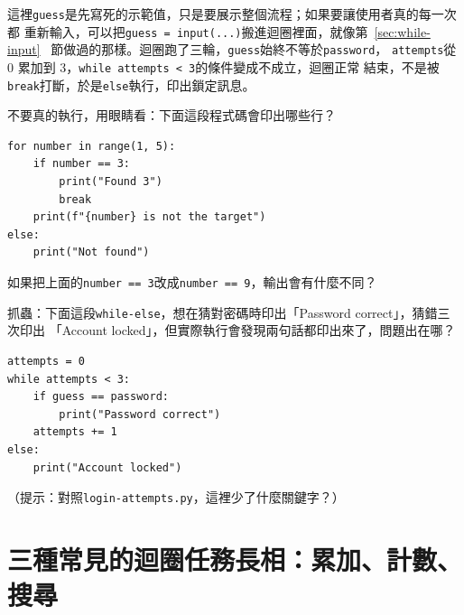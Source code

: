 
這裡\texttt{guess}是先寫死的示範值，只是要展示整個流程；如果要讓使用者真的每一次都
重新輸入，可以把\texttt{guess = input(...)}搬進迴圈裡面，就像第~\ref{sec:while-input}~
節做過的那樣。迴圈跑了三輪，\texttt{guess}始終不等於\texttt{password}，
\texttt{attempts}從 0 累加到 3，\texttt{while attempts < 3}的條件變成不成立，迴圈正常
結束，不是被\texttt{break}打斷，於是\texttt{else}執行，印出鎖定訊息。


\begin{drills}[label=drills:loop-else]
\item 不要真的執行，用眼睛看：下面這段程式碼會印出哪些行？
\begin{verbatim}
for number in range(1, 5):
    if number == 3:
        print("Found 3")
        break
    print(f"{number} is not the target")
else:
    print("Not found")
\end{verbatim}
\item 如果把上面的\texttt{number == 3}改成\texttt{number == 9}，輸出會有什麼不同？
\item 抓蟲：下面這段\texttt{while-else}，想在猜對密碼時印出「Password correct」，猜錯三次印出
「Account locked」，但實際執行會發現兩句話都印出來了，問題出在哪？
\begin{verbatim}
attempts = 0
while attempts < 3:
    if guess == password:
        print("Password correct")
    attempts += 1
else:
    print("Account locked")
\end{verbatim}
（提示：對照\texttt{login-attempts.py}，這裡少了什麼關鍵字？）
\end{drills}

\section{三種常見的迴圈任務長相：累加、計數、搜尋}
\label{sec:accumulate-count}

